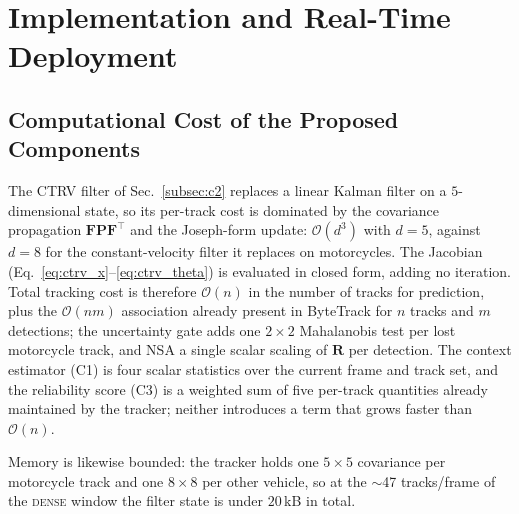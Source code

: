 
\section{Implementation and Real-Time Deployment}
\label{sec:implementation}

\subsection{Computational Cost of the Proposed Components}
\label{subsec:complexity}

The CTRV filter of Sec.~\ref{subsec:c2} replaces a linear Kalman filter on a
$5$-dimensional state, so its per-track cost is dominated by the covariance
propagation $\mathbf{F}\mathbf{P}\mathbf{F}^{\top}$ and the Joseph-form
update: $\mathcal{O}(d^{3})$ with $d=5$, against $d=8$ for the
constant-velocity filter it replaces on motorcycles.
The Jacobian (Eq.~\ref{eq:ctrv_x}--\ref{eq:ctrv_theta}) is evaluated in closed
form, adding no iteration.
Total tracking cost is therefore $\mathcal{O}(n)$ in the number of tracks for
prediction, plus the $\mathcal{O}(nm)$ association already present in
ByteTrack for $n$ tracks and $m$ detections; the uncertainty gate adds one
$2\times2$ Mahalanobis test per lost motorcycle track, and NSA a single scalar
scaling of $\mathbf{R}$ per detection.
The context estimator (C1) is four scalar statistics over the current frame
and track set, and the reliability score (C3) is a weighted sum of five
per-track quantities already maintained by the tracker; neither introduces a
term that grows faster than $\mathcal{O}(n)$.

Memory is likewise bounded: the tracker holds one $5\times5$ covariance per
motorcycle track and one $8\times8$ per other vehicle, so at the $\sim$47
tracks/frame of the \textsc{dense} window the filter state is under
$20$\,kB in total.

